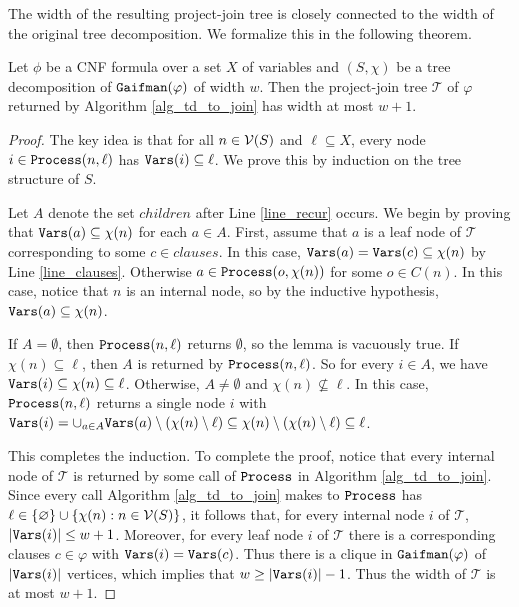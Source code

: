 The width of the resulting project-join tree is closely connected to the width of the original tree decomposition.
We formalize this in the following theorem.
\begin{theorem}
\label{thm_td_to_join}
	Let $\phi$ be a CNF formula over a set $X$ of variables and $(S, \chi)$ be a tree decomposition of $\texttt{\upshape Gaifman}(\varphi)$ of width $w$. Then the project-join tree $\mathcal{T}$ of $\varphi$ returned by Algorithm \ref{alg_td_to_join} has width at most $w+1$.
\end{theorem}
\begin{proof}
The key idea is that for all $n \in \mathcal{V}(S)$ and $\ell \subseteq X$, every node $i \in \texttt{\upshape Process}(n, \ell)$ has $\texttt{\upshape Vars}(i) \subseteq \ell$. We prove this by induction on the tree structure of $S$.

Let $A$ denote the set $children$ after Line \ref{line_recur} occurs. 
We begin by proving that $\texttt{\upshape Vars}(a) \subseteq \chi(n)$ for each $a \in A$.
First, assume that $a$ is a leaf node of $\mathcal{T}$ corresponding to some $c \in clauses$.
In this case, $\texttt{\upshape Vars}(a) = \texttt{\upshape Vars}(c) \subseteq \chi(n)$ by Line \ref{line_clauses}.
Otherwise $a \in \texttt{\upshape Process}(o, \chi(n))$ for some $o \in C(n)$.
In this case, notice that $n$ is an internal node, so by the inductive hypothesis, $\texttt{\upshape Vars}(a) \subseteq \chi(n)$.

If $A = \emptyset$, then $\texttt{\upshape Process}(n, \ell)$ returns $\emptyset$, so the lemma is vacuously true.
If $\chi(n) \subseteq \ell$, then $A$ is returned by $\texttt{\upshape Process}(n, \ell)$.
So for every $i \in A$, we have $\texttt{\upshape Vars}(i) \subseteq \chi(n) \subseteq \ell$.
Otherwise, $A \neq \emptyset$ and $\chi(n) \not\subseteq \ell$.
In this case, $\texttt{\upshape Process}(n, \ell)$ returns a single node $i$ with $\texttt{\upshape Vars}(i) = \cup_{a \in A} \texttt{\upshape Vars}(a) \setminus (\chi(n) \setminus \ell) \subseteq \chi(n) \setminus (\chi(n) \setminus \ell) \subseteq \ell$.

This completes the induction. To complete the proof, notice that every internal node of $\mathcal{T}$ is returned by some call of 
$\texttt{\upshape Process}$ in Algorithm \ref{alg_td_to_join}. Since every call Algorithm \ref{alg_td_to_join} makes to $\texttt{\upshape Process}$ has $\ell \in \{\varnothing\} \cup \{ \chi(n) : n \in \mathcal{V}(S)\}$, it follows that, for every internal node $i$ of $\mathcal{T}$, $| \texttt{\upshape Vars}(i) | \leq w+1$. Moreover, for every leaf node $i$ of $\mathcal{T}$ there is a corresponding clauses $c \in \varphi$ with $\texttt{\upshape Vars}(i) = \texttt{\upshape Vars}(c)$. Thus there is a clique in $\texttt{\upshape Gaifman}(\varphi)$ of $|\texttt{\upshape Vars}(i)|$ vertices, which implies that $w \geq |\texttt{\upshape Vars}(i)| - 1$. Thus the width of $\mathcal{T}$ is at most $w+1$.
\end{proof}

